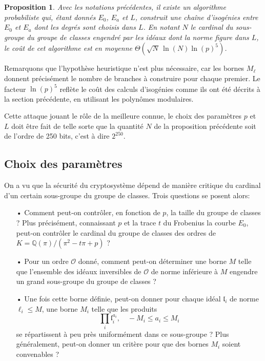 \documentclass[11pt,a4paper]{article}
\newcommand{\Q}{\mathbb{Q}}
\renewcommand{\O}{\mathcal{O}}
\renewcommand{\frak}{\mathfrak}
\renewcommand{\v}{\vspace{5mm}}
\newtheorem*{prop}{Proposition}
\theoremstyle{definition}
\begin{document}
\begin{prop}
Avec les notations précédentes, il existe un algorithme probabiliste qui, étant donnés $E_0$, $E_a$ et $L$, construit une chaîne d'isogénies entre $E_0$ et $E_a$ dont les degrés sont choisis dans $L$. En notant $N$ le cardinal du sous-groupe du groupe de classes engendré par les idéaux dont la norme figure dans $L$, le coût de cet algorithme est en moyenne $\Theta(\sqrt{N}\, \ln(N) \ln(p)^5)$.
\end{prop}

Remarquons que l'hypothèse heuristique n'est plus nécessaire, car les bornes $M_\ell$ donnent précisément le nombre de branches à construire pour chaque premier. Le facteur $\ln(p)^5$ reflète le coût des calculs d'isogénies comme ils ont été décrits à la section précédente, en utilisant les polynômes modulaires.

\v
Cette attaque jouant le rôle de la meilleure connue, le choix des paramètres $p$ et $L$ doit être fait de telle sorte que la quantité $N$ de la proposition précédente soit de l'ordre de 250 bits, c'est à dire $2^{250}$. 



\subsection{Choix des paramètres}

On a vu que la sécurité du cryptosystème dépend de manière critique du cardinal d'un certain sous-groupe du groupe de classes. Trois questions se posent alors:
\begin{itemize}
\item[•] Comment peut-on contrôler, en fonction de $p$, la taille du groupe de classes ? Plus précisément, connaissant $p$ et la trace $t$ du Frobenius la courbe $E_0$, peut-on contrôler le cardinal du groupe de classes des ordres de $K = \Q(\pi)/(\pi^2 - t\pi + p)$ ?
\item[•] Pour un ordre $\O$ donné, comment peut-on déterminer une borne $M$ telle que l'ensemble des idéaux inversibles de $\O$ de norme inférieure à $M$ engendre un grand sous-groupe du groupe de classes ?
\item[•] Une fois cette borne définie, peut-on donner pour chaque idéal ${\frak l}_i$ de norme $\ell_i\leq M$, une borne $M_i$ telle que les produits
$$\prod_{i} {\frak l}_i^{a_i}, \quad - M_i\leq a_i\leq M_i$$
se répartissent à peu près uniformément dans ce sous-groupe ? Plus généralement, peut-on donner un critère pour que des bornes $M_i$ soient convenables ?
\end{itemize}
\end{document}
